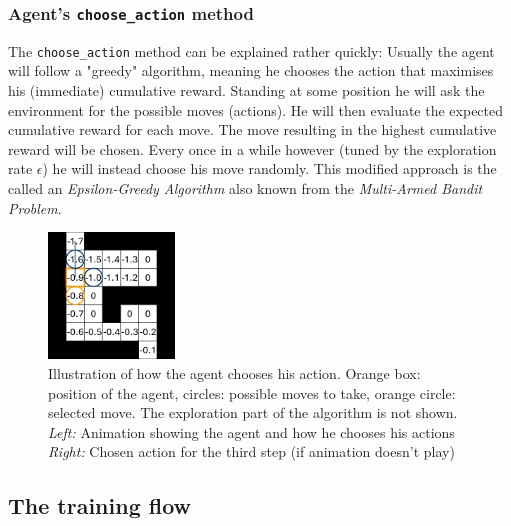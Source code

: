 \documentclass[12pt,a4paper]{scrartcl}
\begin{document}
\FloatBarrier

\subsubsection{Agent's \texttt{choose\_action} method}
\label{sec:choose_action}

The \texttt{choose\_action} method can be explained rather quickly:
Usually the agent will follow a "greedy" algorithm, meaning he chooses the
action that maximises his (immediate) cumulative reward.
Standing at some position he will ask the environment for the possible moves
(actions). He will then evaluate the expected cumulative reward for each move.
The move resulting in the highest cumulative reward will be chosen.
Every once in a while however (tuned by the exploration rate $\epsilon$) he will
instead choose his move randomly. This modified approach is the called an 
\textit{Epsilon-Greedy Algorithm} \cite{eps_greedy} also known from the 
\textit{Multi-Armed Bandit Problem}.

\begin{figure}[htbp]
    \centering
    \includegraphics[width=0.3\textwidth]{choose_action/choosing-6.png}
    \caption{
        Illustration of how the agent chooses his action. Orange box: position
        of the agent, circles: possible moves to take, orange circle: selected
        move. The exploration part of the algorithm is not shown.\\
        \textit{Left:} Animation showing the agent and how he chooses his
        actions \\
        \textit{Right:} Chosen action for the third step 
        (if animation doesn't play)
    }
    \label{fig:choosing}
\end{figure}

\subsection{The training flow}
\label{sec:training}
\end{document}
